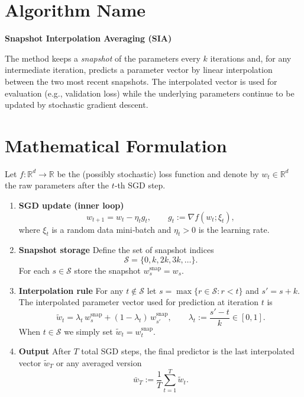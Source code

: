 \documentclass{article}
\newcommand{\R}{\mathbb{R}}
\begin{document}
\section*{Algorithm Name}
\textbf{Snapshot Interpolation Averaging (SIA)}  

The method keeps a \emph{snapshot} of the parameters every $k$ iterations and, for any intermediate iteration, predicts a parameter vector by linear interpolation between the two most recent snapshots. The interpolated vector is used for evaluation (e.g., validation loss) while the underlying parameters continue to be updated by stochastic gradient descent.

\section*{Mathematical Formulation}
Let $f:\R^{d}\rightarrow\R$ be the (possibly stochastic) loss function and denote by $w_t\in\R^{d}$ the raw parameters after the $t$‑th SGD step.  

\begin{enumerate}[label=\arabic*)]
    \item \textbf{SGD update (inner loop)}  
    \[
        w_{t+1}= w_t - \eta_t g_t,\qquad 
        g_t:=\nabla f(w_t;\xi_t),
    \]
    where $\xi_t$ is a random data mini‑batch and $\eta_t>0$ is the learning rate.
    
    \item \textbf{Snapshot storage}  
    Define the set of snapshot indices
    \[
        \mathcal{S}=\{0,k,2k,3k,\dots\}.
    \]
    For each $s\in\mathcal{S}$ store the snapshot $w^{\mathrm{snap}}_{s}=w_{s}$.
    
    \item \textbf{Interpolation rule}  
    For any $t\notin\mathcal{S}$ let $s=\max\{r\in\mathcal{S}:r<t\}$ and $s' = s+k$.  
    The interpolated parameter vector used for prediction at iteration $t$ is
    \[
        \tilde w_t = \lambda_t\, w^{\mathrm{snap}}_{s} + (1-\lambda_t)\, w^{\mathrm{snap}}_{s'},\qquad 
        \lambda_t := \frac{s'-t}{k}\in[0,1].
    \]
    When $t\in\mathcal{S}$ we simply set $\tilde w_t = w^{\mathrm{snap}}_{t}$.
    
    \item \textbf{Output}  
    After $T$ total SGD steps, the final predictor is the last interpolated vector $\tilde w_T$ or any averaged version
    \[
        \bar w_T:=\frac{1}{T}\sum_{t=1}^{T}\tilde w_t .
    \]
\end{enumerate}
\end{document}
